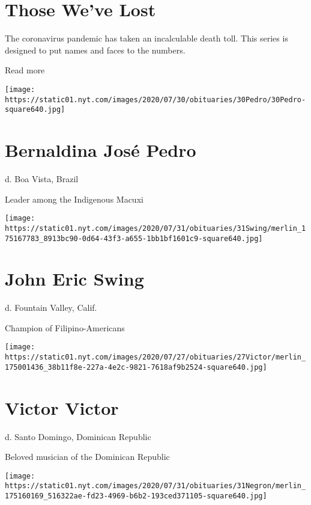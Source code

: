 \href{https://www.nytimes.com/interactive/2020/obituaries/people-died-coronavirus-obituaries.html?action=click\&pgtype=Article\&state=default\&region=BELOW_MAIN_CONTENT\&context=covid_obits_promo}{}

\hypertarget{those-weve-lost}{%
\section{Those We've Lost}\label{those-weve-lost}}

The coronavirus pandemic has taken an incalculable death toll. This
series is designed to put names and faces to the numbers.

Read more

\texttt{[image: https://static01.nyt.com/images/2020/07/30/obituaries/30Pedro/30Pedro-square640.jpg]}

\hypertarget{bernaldina-josuxe9-pedro}{%
\section{Bernaldina José Pedro}\label{bernaldina-josuxe9-pedro}}

d. Boa Vista, Brazil

Leader among the Indigenous Macuxi

\texttt{[image: https://static01.nyt.com/images/2020/07/31/obituaries/31Swing/merlin\_175167783\_8913bc90-0d64-43f3-a655-1bb1bf1601c9-square640.jpg]}

\hypertarget{john-eric-swing}{%
\section{John Eric Swing}\label{john-eric-swing}}

d. Fountain Valley, Calif.

Champion of Filipino-Americans

\texttt{[image: https://static01.nyt.com/images/2020/07/27/obituaries/27Victor/merlin\_175001436\_38b11f8e-227a-4e2c-9821-7618af9b2524-square640.jpg]}

\hypertarget{victor-victor}{%
\section{Victor Victor}\label{victor-victor}}

d. Santo Domingo, Dominican Republic

Beloved musician of the Dominican Republic

\texttt{[image: https://static01.nyt.com/images/2020/07/31/obituaries/31Negron/merlin\_175160169\_516322ae-fd23-4969-b6b2-193ced371105-square640.jpg]}

